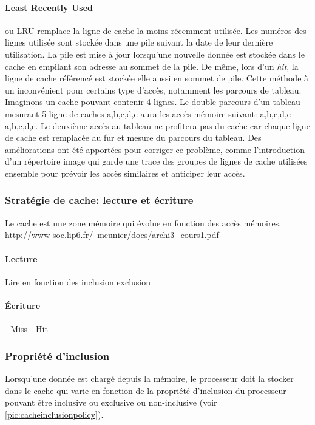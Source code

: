 \paragraph{Least Recently Used} ou LRU remplace la ligne de cache la moins récemment utilisée. Les numéros des lignes utilisée sont stockée dans une pile suivant la date de leur dernière utilisation. La pile est mise à jour lorsqu'une nouvelle donnée est stockée dans le cache en empilant son adresse au sommet de la pile. De même, lors d'un \textit{hit}, la ligne de cache référencé est stockée elle aussi en sommet de pile. Cette méthode à un inconvénient pour certains type d'accès, notamment les parcours de tableau. Imaginons un cache pouvant contenir 4 lignes. Le double parcours d'un tableau mesurant 5 ligne de caches a,b,c,d,e aura les accès mémoire suivant: a,b,c,d,e a,b,c,d,e. Le deuxième accès au tableau ne profitera pas du cache car chaque ligne de cache est remplacée au fur et mesure du parcours du tableau. Des améliorations ont été apportées pour corriger ce problème, comme l'introduction d'un répertoire image \cite{Stone:1987:HCA:31845} qui garde une trace des groupes de lignes de cache utilisées ensemble pour prévoir les accès similaires et anticiper leur accès.






\subsubsection{Stratégie de cache: lecture et écriture}

Le cache est une zone mémoire qui évolue en fonction des accès mémoires. 
http://www-soc.lip6.fr/~meunier/docs/archi3_cours1.pdf

\paragraph{Lecture}

Lire en fonction des inclusion exclusion

\paragraph{Écriture}

- Miss
- Hit







\subsubsection{Propriété d'inclusion}
Lorsqu'une donnée est chargé depuis la mémoire, le processeur doit la stocker dans le cache qui varie en fonction de la propriété d'inclusion du processeur pouvant être inclusive ou exclusive ou non-inclusive (voir \autoref{pic:cacheinclusionpolicy}).

